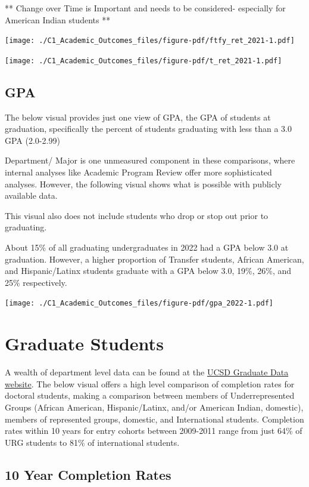 \documentclass[
  letterpaper,
  DIV=11,
  numbers=noendperiod]{scrreprt}
\begin{document}
** Change over Time is Important and needs to be considered- especially
for American Indian students **

\texttt{[image: ./C1\_Academic\_Outcomes\_files/figure-pdf/ftfy\_ret\_2021-1.pdf]}

\texttt{[image: ./C1\_Academic\_Outcomes\_files/figure-pdf/t\_ret\_2021-1.pdf]}

\hypertarget{gpa}{%
\subsection{GPA}\label{gpa}}

The below visual provides just one view of GPA, the GPA of students at
graduation, specifically the percent of students graduating with less
than a 3.0 GPA (2.0-2.99)

Department/ Major is one unmeasured component in these comparisons,
where internal analyses like Academic Program Review offer more
sophisticated analyses. However, the following visual shows what is
possible with publicly available data.

This visual also does not include students who drop or stop out prior to
graduating.

About 15\% of all graduating undergraduates in 2022 had a GPA below 3.0
at graduation. However, a higher proportion of Transfer students,
African American, and Hispanic/Latinx students graduate with a GPA below
3.0, 19\%, 26\%, and 25\% respectively.

\texttt{[image: ./C1\_Academic\_Outcomes\_files/figure-pdf/gpa\_2022-1.pdf]}

\hypertarget{graduate-students}{%
\section{Graduate Students}\label{graduate-students}}

A wealth of department level data can be found at the
\href{https://grad.ucsd.edu/about/grad-data/completion-rates.html}{UCSD
Graduate Data website}. The below visual offers a high level comparison
of completion rates for doctoral students, making a comparison between
members of Underrepresented Groups (African American, Hispanic/Latinx,
and/or American Indian, domestic), members of represented groups,
domestic, and International students. Completion rates within 10 years
for entry cohorts between 2009-2011 range from just 64\% of URG students
to 81\% of international students.

\hypertarget{year-completion-rates}{%
\subsection{10 Year Completion Rates}\label{year-completion-rates}}
\end{document}
